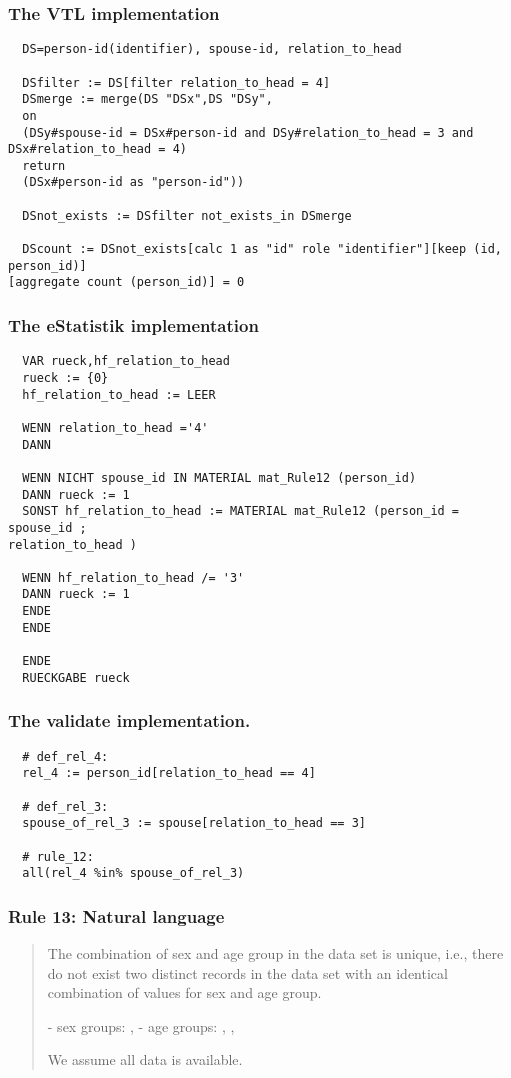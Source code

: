 \subsubsection*{The VTL implementation}
\begin{verbatim}
  DS=person-id(identifier), spouse-id, relation_to_head

  DSfilter := DS[filter relation_to_head = 4]
  DSmerge := merge(DS "DSx",DS "DSy",
  on
  (DSy#spouse-id = DSx#person-id and DSy#relation_to_head = 3 and
DSx#relation_to_head = 4)
  return
  (DSx#person-id as "person-id"))

  DSnot_exists := DSfilter not_exists_in DSmerge

  DScount := DSnot_exists[calc 1 as "id" role "identifier"][keep (id, person_id)]
[aggregate count (person_id)] = 0
\end{verbatim}
\subsubsection*{The eStatistik implementation}
\begin{verbatim}
  VAR rueck,hf_relation_to_head
  rueck := {0}
  hf_relation_to_head := LEER

  WENN relation_to_head ='4'
  DANN

  WENN NICHT spouse_id IN MATERIAL mat_Rule12 (person_id)
  DANN rueck := 1
  SONST hf_relation_to_head := MATERIAL mat_Rule12 (person_id = spouse_id ;
relation_to_head )

  WENN hf_relation_to_head /= '3'
  DANN rueck := 1
  ENDE
  ENDE

  ENDE
  RUECKGABE rueck
\end{verbatim}
\subsubsection*{The validate implementation.}
\begin{verbatim}
  # def_rel_4:
  rel_4 := person_id[relation_to_head == 4]

  # def_rel_3:
  spouse_of_rel_3 := spouse[relation_to_head == 3]

  # rule_12:
  all(rel_4 %in% spouse_of_rel_3)
\end{verbatim}


\newpage

\subsubsection*{  Rule 13: Natural language}
\begin{quote}


The combination of sex and age group in the data set is unique, i.e., there do not exist two distinct records in
the data set with an identical combination of values for sex and age group.

- sex groups: , 
- age groups: , ,  

We assume all data is available.


\end{quote}
